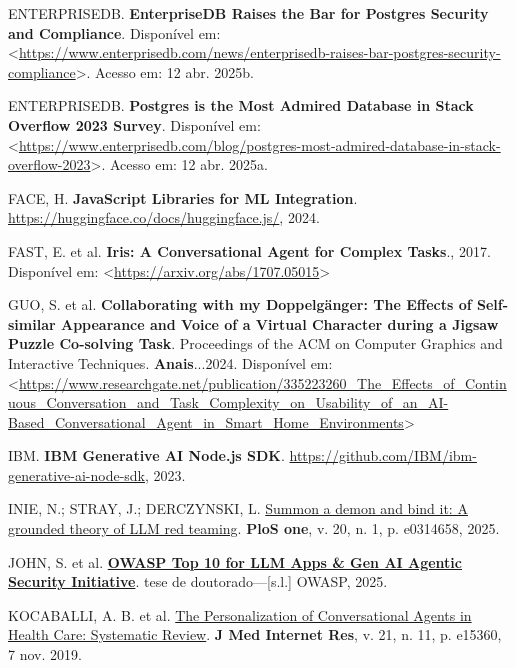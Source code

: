 \documentclass[
]{article}
\newlength{\cslhangindent}
\newenvironment{CSLReferences}[2] %
 {\begin{list}{}{%
  \setlength{\itemindent}{0pt}
  \setlength{\leftmargin}{0pt}
  \setlength{\parsep}{0pt}
  \ifodd #1
   \setlength{\leftmargin}{\cslhangindent}
   \setlength{\itemindent}{-1\cslhangindent}
  \fi
  \setlength{\itemsep}{#2\baselineskip}}}
 {\end{list}}
\begin{document}
\begin{CSLReferences}{0}{1}
ENTERPRISEDB. \textbf{EnterpriseDB Raises the Bar for Postgres Security
and Compliance}. Disponível em:
\textless{}\url{https://www.enterprisedb.com/news/enterprisedb-raises-bar-postgres-security-compliance}\textgreater.
Acesso em: 12 abr. 2025b.

ENTERPRISEDB. \textbf{Postgres is the Most Admired Database in Stack
Overflow 2023 Survey}. Disponível em:
\textless{}\url{https://www.enterprisedb.com/blog/postgres-most-admired-database-in-stack-overflow-2023}\textgreater.
Acesso em: 12 abr. 2025a.

FACE, H. \textbf{JavaScript Libraries for ML Integration}.
\url{https://huggingface.co/docs/huggingface.js/}, 2024.

FAST, E. et al. \textbf{Iris: A Conversational Agent for Complex
Tasks}., 2017. Disponível em:
\textless{}\url{https://arxiv.org/abs/1707.05015}\textgreater{}

GUO, S. et al. \textbf{Collaborating with my Doppelgänger: The Effects
of Self-similar Appearance and Voice of a Virtual Character during a
Jigsaw Puzzle Co-solving Task}. Proceedings of the ACM on Computer
Graphics and Interactive Techniques. \textbf{Anais}...2024. Disponível
em:
\textless{}\url{https://www.researchgate.net/publication/335223260_The_Effects_of_Continuous_Conversation_and_Task_Complexity_on_Usability_of_an_AI-Based_Conversational_Agent_in_Smart_Home_Environments}\textgreater{}

IBM. \textbf{IBM Generative AI Node.js SDK}.
\url{https://github.com/IBM/ibm-generative-ai-node-sdk}, 2023.

INIE, N.; STRAY, J.; DERCZYNSKI, L.
\href{https://journals.plos.org/plosone/article?id=10.1371/journal.pone.0314658}{Summon
a demon and bind it: A grounded theory of LLM red teaming}. \textbf{PloS
one}, v. 20, n. 1, p. e0314658, 2025.

JOHN, S. et al.
\textbf{\href{https://genai.owasp.org/llmrisk/llm01-prompt-injection}{OWASP
Top 10 for LLM Apps \& Gen AI Agentic Security Initiative}}. tese de
doutorado---{[}s.l.{]} OWASP, 2025.

KOCABALLI, A. B. et al. \href{https://doi.org/10.2196/15360}{The
Personalization of Conversational Agents in Health Care: Systematic
Review}. \textbf{J Med Internet Res}, v. 21, n. 11, p. e15360, 7 nov.
2019.


\end{CSLReferences}
\end{document}
